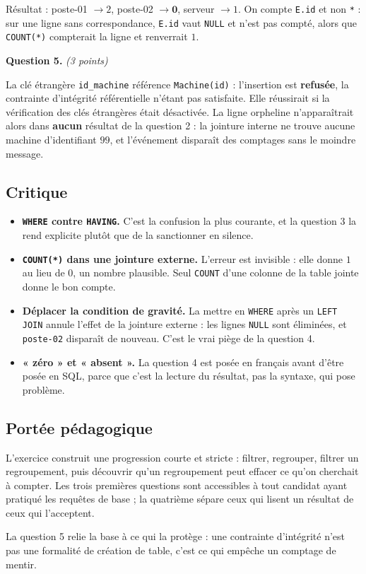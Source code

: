 Résultat : poste-01 $\rightarrow 2$, poste-02 $\rightarrow \mathbf{0}$, serveur
$\rightarrow 1$. On compte \lstinline{E.id} et non \lstinline{*} : sur une
ligne sans correspondance, \lstinline{E.id} vaut \lstinline{NULL} et n'est pas
compté, alors que \lstinline{COUNT(*)} compterait la ligne et renverrait $1$.

\medskip
\textbf{Question 5.} \emph{(3 points)}

La clé étrangère \lstinline{id_machine} référence \lstinline{Machine(id)} :
l'insertion est \textbf{refusée}, la contrainte d'intégrité référentielle
n'étant pas satisfaite. Elle réussirait si la vérification des clés étrangères
était désactivée. La ligne orpheline n'apparaîtrait alors dans \textbf{aucun}
résultat de la question 2 : la jointure interne ne trouve aucune machine
d'identifiant $99$, et l'événement disparaît des comptages sans le moindre
message.

\subsection*{Critique}

\begin{itemize}
  \item \textbf{\lstinline{WHERE} contre \lstinline{HAVING}.} C'est la
    confusion la plus courante, et la question 3 la rend explicite plutôt que
    de la sanctionner en silence.
  \item \textbf{\lstinline{COUNT(*)} dans une jointure externe.} L'erreur est
    invisible : elle donne $1$ au lieu de $0$, un nombre plausible. Seul
    \lstinline{COUNT} d'une colonne de la table jointe donne le bon compte.
  \item \textbf{Déplacer la condition de gravité.} La mettre en
    \lstinline{WHERE} après un \lstinline{LEFT JOIN} annule l'effet de la
    jointure externe : les lignes \lstinline{NULL} sont éliminées, et
    \lstinline{poste-02} disparaît de nouveau. C'est le vrai piège de la
    question 4.
  \item \textbf{« zéro » et « absent ».} La question 4 est posée en français
    avant d'être posée en SQL, parce que c'est la lecture du résultat, pas la
    syntaxe, qui pose problème.
\end{itemize}

\subsection*{Portée pédagogique}

L'exercice construit une progression courte et stricte : filtrer, regrouper,
filtrer un regroupement, puis découvrir qu'un regroupement peut effacer ce
qu'on cherchait à compter. Les trois premières questions sont accessibles à
tout candidat ayant pratiqué les requêtes de base ; la quatrième sépare ceux
qui lisent un résultat de ceux qui l'acceptent.

La question 5 relie la base à ce qui la protège : une contrainte d'intégrité
n'est pas une formalité de création de table, c'est ce qui empêche un comptage
de mentir.
